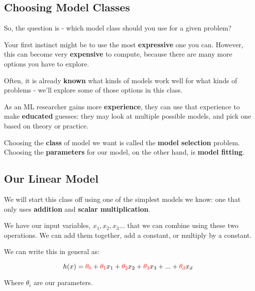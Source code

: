     \subsection{Choosing Model Classes}
    
        So, the question is - which model class should you use for a given problem?
        
        Your first instinct might be to use the most \textbf{expressive} one you can. However, this can become very \textbf{expensive} to compute, because there are many more options you have to explore.
        
        Often, it is already \textbf{known} what kinds of models work well for what kinds of problems - we'll explore some of those options in this class.
        
        As an ML researcher gains more \textbf{experience}, they can use that experience to make \textbf{educated} guesses: they may look at multiple possible models, and pick one based on theory or practice.
        
        Choosing the \textbf{class} of model we want is called the \textbf{model selection} problem. Choosing the \textbf{parameters} for our model, on the other hand, is \textbf{model fitting}.
    
    \subsection{Our Linear Model}
    
        We will start this class off using one of the simplest models we know: one that only uses \textbf{addition} and \textbf{scalar multiplication}.
        
        We have our input variables, $x_1, x_2, x_3...$ that we can combine using these two operations. We can add them together, add a constant, or multiply by a constant.
        
        We can write this in general as:
        
        \begin{equation}
            h(x) = \textcolor{red}{\theta_0} + \textcolor{red}{\theta_1}x_1 + \textcolor{red}{\theta_2}x_2 + \textcolor{red}{\theta_3}x_3 + ... + \textcolor{red}{\theta_d}x_d
        \end{equation}
        
        Where $\theta_i$ are our parameters. 
        
